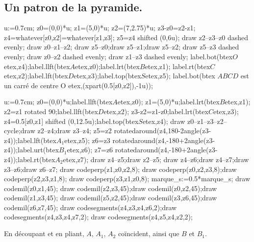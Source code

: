 \clearpage
\subsection{Un patron de la pyramide.}
\begin{center}
    \hfill
    \begin{Geometrie}[CoinBG={(-0.5u,-2u)}]
        u:=0.7cm;
        z0=(0,0)*u;
        z1=(5,0)*u;
        z2=(7,2.75)*u;
        z3-z0=z2-z1;
        z4=whatever[z0,z2]=whatever[z1,z3];
        z5=z4 shifted (0,6u);
        draw z2--z3--z0 dashed evenly;
        draw z0--z1--z2; draw z5--z0;draw z5--z1;draw z5--z2; draw z5--z3 dashed evenly;
        draw z0--z2 dashed evenly; draw z1--z3 dashed evenly;
        label.bot(btex$O$etex,z4);label.llft(btex$A$etex,z0);label.lrt(btex$B$etex,z1);
        label.rt(btex$C$etex,z2);label.lft(btex$D$etex,z3);label.top(btex$S$etex,z5);
        label.bot(btex $ABCD$ est un carré de centre O etex,(xpart(0.5[z0,z2]),-1u));
    \end{Geometrie}
    \hfill
    \begin{Geometrie}[CoinBG={(-4u,-2u)}]
        u:=0.7cm;
        z0=(0,0)*u;label.llft(btex$A$etex,z0);
        z1=(5,0)*u;label.lrt(btex$B$etex,z1);
        z2=z1 rotated 90;label.llft(btex$D$etex,z2);
        z3-z2=z1-z0;label.lrt(btex$C$etex,z3);
        z4=0.5[z0,z1] shifted (0,12.5u);label.top(btex$S$etex,z4);
        draw z0--z1--z3--z2--cycle;draw z2--z4;draw z3--z4;
        z5=z2 rotatedaround(z4,180-2angle(z3-z4));label.lft(btex$A_{1}$etex,z5);
        z6=z3 rotatedaround(z4,-180+2angle(z3-z4));label.urt(btex$B_{1}$etex,z6);
        z7=z6 rotatedaround(z4,-180+2angle(z3-z4));label.rt(btex$A_{2}$etex,z7);
        draw z4--z5;draw z2--z5; draw z4--z6;draw z4--z7;draw z3--z6;draw z6--z7;
        draw codeperp(z1,z0,z2,8); draw codeperp(z0,z2,z3,8);draw codeperp(z2,z3,z1,8);
        draw codeperp(z3,z1,z0,8);
        marque_s:=0.5*marque_s;
        draw codemil(z0,z1,45);
        draw codemil(z2,z3,45);draw codemil(z0,z2,45);draw codemil(z1,z3,45);
        draw codemil(z5,z2,45);draw codemil(z3,z6,45);draw codemil(z6,z7,45);
        draw codesegments(z4,z3,z4,z6,2);draw codesegments(z4,z3,z4,z7,2);
        draw codesegments(z4,z5,z4,z2,2);
    \end{Geometrie}
    \hfill


En découpant et en pliant, $A$, $A_{1}$, $A_{2}$ co\"{i}ncident, ainsi que $B$ et $B_{1}$.
\end{center}


